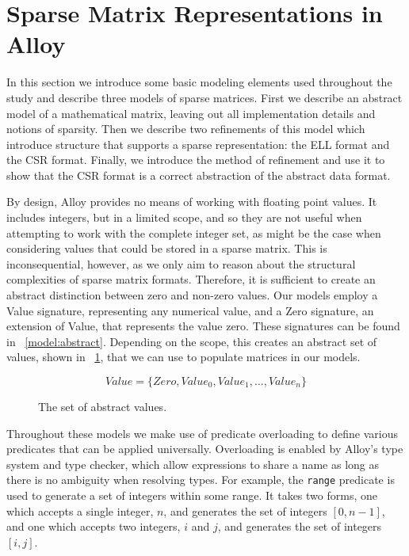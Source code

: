 \section{Sparse Matrix Representations in Alloy}
\label{sec:reps}

In this section we introduce some basic modeling elements used throughout the study and describe three models of sparse matrices.  First we describe an abstract model of a mathematical matrix, leaving out all implementation details and notions of sparsity.  Then we describe two refinements of this model which introduce structure that supports a sparse representation: the ELL format and the CSR format.  Finally, we introduce the method of refinement and use it to show that the CSR format is a correct abstraction of the abstract data format.

By design, Alloy provides no means of working with floating point values.  It includes integers, but in a limited scope, and so they are not useful when attempting to work with the complete integer set, as might be the case when considering values that could be stored in a sparse matrix.  This is inconsequential, however, as we only aim to reason about the structural complexities of sparse matrix formats.  Therefore, it is sufficient to create an abstract distinction between zero and non-zero values.  Our models employ a Value signature, representing any numerical value, and a Zero signature, an extension of Value, that represents the value zero.  These signatures can be found in \figurename~\ref{model:abstract}.  Depending on the scope, this creates an abstract set of values, shown in \figurename~\ref{fig:values}, that we can use to populate matrices in our models.

\begin{figure}
\begin{displaymath}
Value = \{Zero, Value_0, Value_1, \ldots, Value_n\}
\end{displaymath}
\caption{The set of abstract values.}
\label{fig:values}
\end{figure}

Throughout these models we make use of predicate overloading to define various predicates that can be applied universally.  Overloading is enabled by Alloy's type system and type checker, which allow expressions to share a name as long as there is no ambiguity when resolving types.  For example, the \texttt{range} predicate is used to generate a set of integers within some range.  It takes two forms, one which accepts a single integer, $n$, and generates the set of integers $[0,n-1]$, and one which accepts two integers, $i$ and $j$, and generates the set of integers $[i, j]$.

